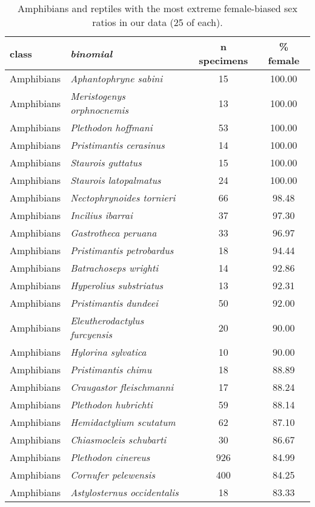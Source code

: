 \begin{longtable}{l>{\itshape}lcc}
\caption{Amphibians and reptiles with the most extreme female-biased sex ratios
                  in our data (25 of each).} \\ 
  \hline
class & binomial & n specimens & \% female \\ 
  \hline
Amphibians & Aphantophryne sabini &  15 & 100.00 \\ 
  Amphibians & Meristogenys orphnocnemis &  13 & 100.00 \\ 
  Amphibians & Plethodon hoffmani &  53 & 100.00 \\ 
  Amphibians & Pristimantis cerasinus &  14 & 100.00 \\ 
  Amphibians & Staurois guttatus &  15 & 100.00 \\ 
  Amphibians & Staurois latopalmatus &  24 & 100.00 \\ 
  Amphibians & Nectophrynoides tornieri &  66 & 98.48 \\ 
  Amphibians & Incilius ibarrai &  37 & 97.30 \\ 
  Amphibians & Gastrotheca peruana &  33 & 96.97 \\ 
  Amphibians & Pristimantis petrobardus &  18 & 94.44 \\ 
  Amphibians & Batrachoseps wrighti &  14 & 92.86 \\ 
  Amphibians & Hyperolius substriatus &  13 & 92.31 \\ 
  Amphibians & Pristimantis dundeei &  50 & 92.00 \\ 
  Amphibians & Eleutherodactylus furcyensis &  20 & 90.00 \\ 
  Amphibians & Hylorina sylvatica &  10 & 90.00 \\ 
  Amphibians & Pristimantis chimu &  18 & 88.89 \\ 
  Amphibians & Craugastor fleischmanni &  17 & 88.24 \\ 
  Amphibians & Plethodon hubrichti &  59 & 88.14 \\ 
  Amphibians & Hemidactylium scutatum &  62 & 87.10 \\ 
  Amphibians & Chiasmocleis schubarti &  30 & 86.67 \\ 
  Amphibians & Plethodon cinereus & 926 & 84.99 \\ 
  Amphibians & Cornufer pelewensis & 400 & 84.25 \\ 
  Amphibians & Astylosternus occidentalis &  18 & 83.33 \\ 

\end{longtable}

